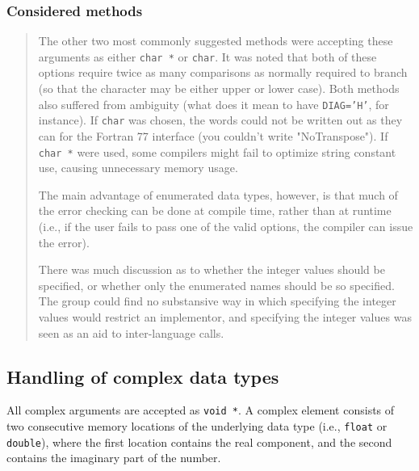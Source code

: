 \documentclass{article}
\begin{document}
\subsubsection{Considered methods}
{\it
\begin{quotation}
The other two most commonly suggested methods were accepting these arguments as
either {\tt char~*} or {\tt char}.  It was noted that both of these options
require twice as many comparisons as normally required to branch (so that the
character may be either upper or lower case).  Both methods also suffered from
ambiguity (what does it mean to have {\tt DIAG='H'}, for instance).
If {\tt char} was chosen, the words could not be written out as they can for the
Fortran 77 interface (you couldn't write "NoTranspose").  If {\tt char~*} were
used, some compilers might fail to optimize string constant use, causing
unnecessary memory usage.

The main advantage of enumerated data types, however, is that much of the error
checking can be done at compile time, rather than at runtime (i.e., if the
user fails to pass one of the valid options, the compiler can issue the error).

There was much discussion as to whether the integer values should be specified,
or whether only the enumerated names should be so specified.  The group could
find no substansive way in which specifying the integer values would restrict
an implementor, and specifying the integer values was seen as an aid to
inter-language calls.
\end{quotation}
}

\subsection{Handling of complex data types}\label{legacy:c_handlingcomplex}


All complex arguments are accepted as {\tt void *}.  A complex element consists
of two consecutive memory locations of the underlying data type
(i.e., {\tt float} or {\tt double}), where the first location contains the
real component, and the second contains the imaginary part of the number.
\end{document}
